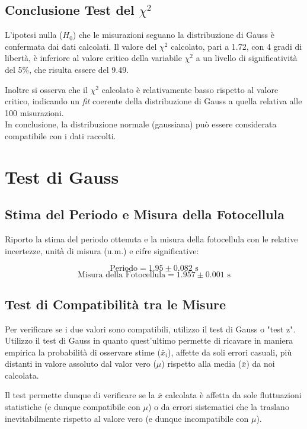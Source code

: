 \documentclass{article}
\begin{document}
\subsection{Conclusione Test del $\chi^2$}
L'ipotesi nulla ($H_0$) che le misurazioni seguano la distribuzione di Gauss è confermata dai dati calcolati. Il valore del $\chi^2$ calcolato, pari a 1.72, con 4 gradi di libertà, è inferiore al valore critico della variabile $\chi^2$ a un livello di significatività del 5\%, che risulta essere del 9.49.

Inoltre si osserva che il $\chi^2$ calcolato è relativamente basso rispetto al valore critico, indicando un \textit{fit} coerente della distribuzione di Gauss a quella relativa alle 100 misurazioni. 
\\In conclusione, la distribuzione normale (gaussiana) può essere considerata compatibile con i dati raccolti.

\section{Test di Gauss}
\subsection{Stima del Periodo e Misura della Fotocellula}

Riporto la stima del periodo ottenuta e la misura della fotocellula con le relative incertezze, unità di misura (u.m.) e cifre significative:

\[ \text{Periodo} = 1.95 \pm 0.082\text{ s} \]
\[ \text{Misura della Fotocellula} = 1.957 \pm 0.001 \text{ s} \]

\subsection{Test di Compatibilità tra le Misure}

Per verificare se i due valori sono compatibili, utilizzo il test di Gauss o "test z".\\
Utilizzo il test di Gauss in quanto quest'ultimo permette di ricavare in maniera empirica la probabilità di osservare stime ($\bar{x}_i$), affette da soli errori casuali, più distanti in valore assoluto dal valor vero ($\mu$) rispetto alla media ($\bar{x}$) da noi calcolata. 

Il test permette dunque di verificare se la $\bar{x}$ calcolata è affetta da sole fluttuazioni statistiche (e dunque compatibile con $\mu$) o da errori sistematici che la traslano inevitabilmente rispetto al valore vero (e dunque incompatibile con $\mu$). 
\end{document}
